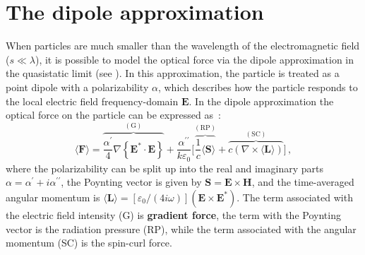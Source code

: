 \section{The dipole approximation~\cite{ownpub1, ownpub3}}

When particles are much smaller than the wavelength of the electromagnetic field ($s\ll \lambda$), it is possible to model the optical force via the dipole approximation in the
quasistatic limit (see ). In this approximation, the particle is treated as a point dipole with a polarizability $\alpha$, which describes how the particle responds to the local electric field frequency-domain $\mathbf{E}$.
In the dipole approximation the optical force on the particle can be expressed as~\cite{novotny}:
\begin{equation}\label{eq:dip_force}
    \langle\mathbf{F}\rangle=\overbrace{\frac{\alpha^{\prime}}{4} \nabla\left\{\mathbf{E}^* \cdot \mathbf{E}\right\}}^{(\text{G})}
    +\frac{\alpha^{\prime \prime}}{k \varepsilon_0} \Big[\overbrace{\frac{1}{c}\langle \mathbf{S} \rangle}^{(\text{RP})} + \overbrace{c \left( \nabla \times \langle \mathbf{L} \rangle \right)}^{(\text{SC})}\Big]\,,
\end{equation}
where the polarizability can be split up into the real and imaginary parts 
$\alpha=\alpha^\prime + i \alpha^{\prime \prime}$, the Poynting vector is given by $\mathbf{S} = \mathbf{E} \times \mathbf{H}$, and the time-averaged angular momentum is 
$\langle \mathbf{L} \rangle = [\varepsilon_0/(4 i \omega)](\mathbf{E} \times \mathbf{E}^*)$. 
The term associated with the electric field intensity (G) is \textbf{gradient force}, the term with the Poynting vector is the radiation pressure (RP), while the term associated 
with the angular momentum (SC) is the spin-curl force.

